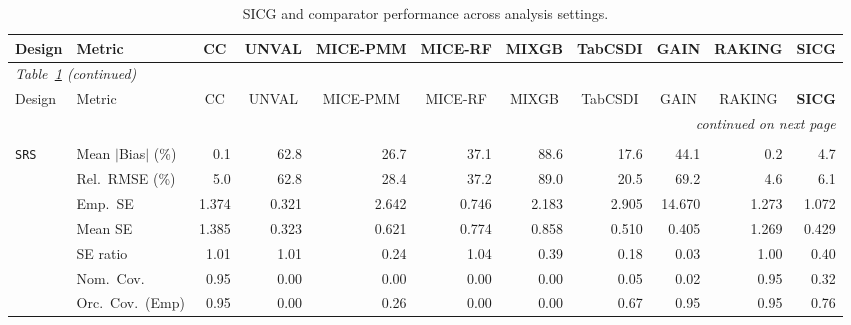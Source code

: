\begin{landscape}
\footnotesize\setlength{\tabcolsep}{3.5pt}
\begin{longtable}{llrrrrrrrrr}
\caption{SICG and comparator performance across analysis settings.}
\label{tab:appc_nutri_Gaussian} \\
\toprule
Design & Metric & \multicolumn{1}{c}{CC} & \multicolumn{1}{c}{UNVAL} & \multicolumn{1}{c}{MICE-PMM} & \multicolumn{1}{c}{MICE-RF} & \multicolumn{1}{c}{MIXGB} & \multicolumn{1}{c}{TabCSDI} & \multicolumn{1}{c}{GAIN} & \multicolumn{1}{c}{RAKING} & \multicolumn{1}{c}{\textbf{SICG}} \\
\midrule \endfirsthead
\multicolumn{11}{l}{\footnotesize\itshape Table~\ref{tab:appc_nutri_Gaussian} (continued)} \\
\toprule
Design & Metric & \multicolumn{1}{c}{CC} & \multicolumn{1}{c}{UNVAL} & \multicolumn{1}{c}{MICE-PMM} & \multicolumn{1}{c}{MICE-RF} & \multicolumn{1}{c}{MIXGB} & \multicolumn{1}{c}{TabCSDI} & \multicolumn{1}{c}{GAIN} & \multicolumn{1}{c}{RAKING} & \multicolumn{1}{c}{\textbf{SICG}} \\
\midrule \endhead
\midrule \multicolumn{11}{r}{\footnotesize\itshape continued on next page} \\
\endfoot
\bottomrule \endlastfoot
\multicolumn{11}{l}{\textbf{Continuous Phase-Two Covariates}} \\
\addlinespace[2pt]
\quad \texttt{SRS} & Mean $|$Bias$|$ (\%) & \cellcolor{rankone}0.1 & 62.8 & 26.7 & 37.1 & 88.6 & 17.6 & 44.1 & \cellcolor{ranktwo}0.2 & \cellcolor{rankthree}4.7 \\
 & Rel.\ RMSE (\%) & \cellcolor{ranktwo}5.0 & 62.8 & 28.4 & 37.2 & 89.0 & 20.5 & 69.2 & \cellcolor{rankone}4.6 & \cellcolor{rankthree}6.1 \\
 & Emp.\ SE & 1.374 & 0.321 & 2.642 & 0.746 & 2.183 & 2.905 & 14.670 & 1.273 & 1.072 \\
 & Mean SE & 1.385 & 0.323 & 0.621 & 0.774 & 0.858 & 0.510 & 0.405 & 1.269 & 0.429 \\
 & SE ratio & \cellcolor{ranktwo}1.01 & \cellcolor{ranktwo}1.01 & 0.24 & \cellcolor{rankthree}1.04 & 0.39 & 0.18 & 0.03 & \cellcolor{rankone}1.00 & 0.40 \\
 & Nom.\ Cov. & \cellcolor{rankone}0.95 & 0.00 & 0.00 & 0.00 & 0.00 & \cellcolor{rankthree}0.05 & 0.02 & \cellcolor{rankone}0.95 & \cellcolor{ranktwo}0.32 \\
 & Orc.\ Cov.\ (Emp) & \cellcolor{rankone}0.95 & 0.00 & 0.26 & 0.00 & 0.00 & \cellcolor{rankthree}0.67 & \cellcolor{rankone}0.95 & \cellcolor{rankone}0.95 & \cellcolor{ranktwo}0.76 \\

\end{longtable}
\end{landscape}
